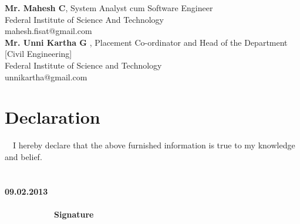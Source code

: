 \documentclass[a4paper]{article}
\begin{document}
\textbf{Mr. Mahesh C},  System Analyst cum Software Engineer\\
\indent  Federal Institute of  Science And Technology \\
\indent mahesh.fisat@gmail.com \\

\textbf{Mr. Unni Kartha G} , Placement Co-ordinator  and Head of the Department [Civil Engineering] \\ 
\indent Federal Institute of Science and Technology\\ 
\indent unnikartha@gmail.com 

\section{Declaration}
\indent \ \ I hereby declare that the above furnished information is true to my knowledge and belief. \\ \\ \\
\vspace{5\baselineskip}
\indent \textbf {09.02.2013} \indent \ \ \ \ \ \ \ \ \ \ \ \ \ \ \ \ \ \ \ \ \ \ \ \ \ \ \ \ \ \ \ \ \ \ \ \ \ \ \ \ \ \ \ \ \ \ \ \ \ \ \ \ \ \ \ \ \ \ \ \ \ \ \ \ \ \ \ \ \ \ \ \ \ \ \ \ \ \ \ \ \ \ \ \ \textbf{Signature}
\end{document}
